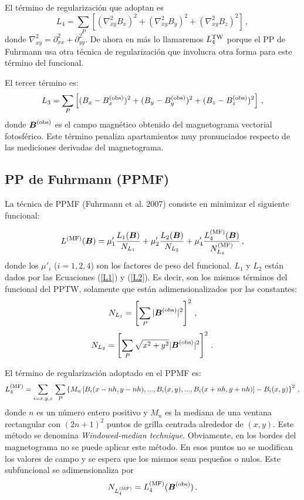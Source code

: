 \documentclass[a4paper,10pt]{article}
\def\bB{{\boldsymbol{B}}}
\def\bx{B_x}
\def\by{B_y}
\def\bz{B_z}
\def\bxobs{B_x^{\rm (obs)}}
\def\byobs{B_y^{\rm (obs)}}
\def\bzobs{B_z^{\rm (obs)}}
\def\lapl{\nabla^2}
\def\lapl2D{\nabla^2_{xy}}
\def\bBobs{{\boldsymbol{B}}^{\rm (obs)}}
\def\eqs#1#2{Ecuaciones (\ref{#1}) y (\ref{#2})}
\begin{document}
El término de regularización que adoptan es
\begin{equation}
L_4 = \sum_P \left[ \left(\lapl2D \bx\right)^2 +\left(\lapl2D \by\right)^2 + \left(\lapl2D \bz\right)^2\right] \,,
\end{equation}
donde $\lapl2D = \partial^2_{xx}+\partial^2_{yy}$. De ahora en más lo llamaremos $L_4^{\rm TW}$ porque el PP de Fuhrmann usa otra técnica de regularización que involucra otra forma para este término del funcional.

El tercer término es:
\begin{equation}
 L_3 = \sum_P \left[(\bx - \bxobs)^2 + (\by - \byobs)^2 + (\bz - \bzobs)^2    \right] \,,
\end{equation}
donde $\bBobs$ es el campo magnético obtenido del magnetograma vectorial fotosférico. Este término penaliza apartamientos muy pronunciados respecto de las mediciones derivadas del magnetograma.


\subsection{PP de Fuhrmann (PPMF)}

La técnica de PPMF (Fuhrmann et al. 2007) consiste en minimizar el siguiente funcional: 

\begin{equation}
 L^{(\rm MF)}(\bB)=\mu'_1\frac{L_1(\bB)}{N_{L_1}}+\mu'_2\frac{L_2(\bB)}{N_{L_2}}+\mu'_4\frac{L^{(\rm MF)}_4(\bB)}{N^{(\rm MF)}_{L_4}} \,,
\end{equation}
donde los $\mu'_i$ ($i=1,2,4$) son los factores de peso del funcional.
$L_1$ y $L_2$ están dados por las \eqs{L1}{L2}. Es decir, son los mismos términos del funcional del PPTW, solamente que están adimensionalizados por las constantes: 
\begin{equation}
 N_{L_1} = \left[\sum_P |\bBobs|^2 \right]^2 \,,
\end{equation}
\begin{equation}
 N_{L_2} = \left[\sum_P \sqrt{x^2+y^2}|\bBobs|^2 \right]^2 \,. 
\end{equation}

El término de regularización adoptado en el PPMF es: 
\begin{equation}
 L^{(\rm MF)}_4 = \sum_{i=x,y,z}\,\sum_P \left\{ M_n \left[ B_i (x-nh,y-nh),...,B_i(x,y),...,B_i (x+nh,y+nh)\right]-B_i(x,y)\right\}^2 \,,
\end{equation}
donde $n$ es un número entero positivo y $M_n$ es la mediana de una ventana rectangular con $(2n+1)^2$ puntos de grilla centrada alrededor de $(x,y)$. Este método se denomina \emph{Windowed-median technique}. Obviamente, en los bordes del magnetograma no se puede aplicar este método. En esos puntos no se modifican los valores de campo y se espera que los mismos sean pequeños o nulos. Este subfuncional se adimensionaliza por
\begin{equation}
 N_{L^{(\rm MF)}_4}= L^{(\rm MF)}_4 (\bBobs) \,.
\end{equation}
\end{document}
